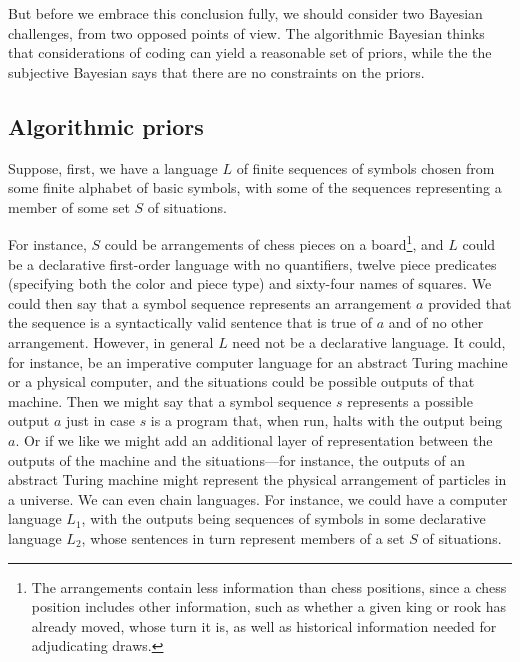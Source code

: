 But before we embrace this conclusion fully, we should consider two Bayesian challenges, from two opposed points of view.
The algorithmic Bayesian thinks that considerations of coding can yield a reasonable set of priors, while the 
the subjective Bayesian says that there are no constraints on the priors.

\subsection{Algorithmic priors}
Suppose, first, we have a language $L$ of finite sequences of symbols chosen from some finite alphabet of basic symbols, 
with some of the sequences representing a member of some set $S$ of situations. 

For instance, $S$ could be arrangements of chess pieces on a board\footnote{The arrangements contain less information
than chess positions, since a chess position includes other information, such as whether a given king or rook has already
moved, whose turn it is, as well as historical information needed for adjudicating draws.}, and $L$ could be a declarative 
first-order language with no quantifiers, twelve piece predicates (specifying both the color and piece type) and sixty-four names of squares.
We could then say that a symbol sequence represents an arrangement $a$ provided that the sequence is a 
syntactically valid sentence that is true of $a$ and of no other arrangement. However, in general $L$ need not be a declarative
language. It could, for instance, be an imperative computer language for an abstract Turing machine or a physical computer,
and the situations could be possible outputs of that machine. Then we might say that a symbol sequence $s$ represents
a possible output $a$ just in case $s$ is a program that, when run, halts with the output being $a$. Or if we like we might 
add an additional layer of representation between the outputs of the machine and the situations---for instance, the outputs
of an abstract Turing machine might represent the physical arrangement of particles in a universe.  
We can even chain languages. For instance, we could have a computer language $L_1$, with the outputs being sequences of
symbols in some declarative language $L_2$, whose sentences in turn represent members of a set $S$ of situations.

